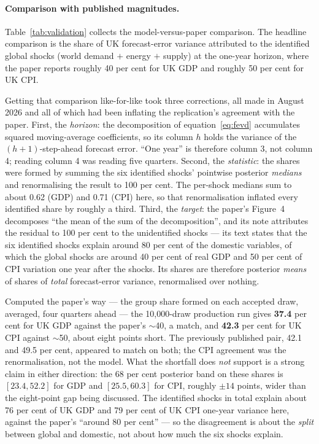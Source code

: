\paragraph{Comparison with published magnitudes.} Table~\ref{tab:validation} collects the model-versus-paper comparison. The headline comparison is the share of UK forecast-error variance attributed to the identified global shocks (world demand $+$ energy $+$ supply) at the one-year horizon, where the paper reports roughly 40 per cent for UK GDP and roughly 50 per cent for UK CPI.

Getting that comparison like-for-like took three corrections, all made in August 2026 and all of which had been inflating the replication's agreement with the paper. First, the \emph{horizon}: the decomposition of equation~\eqref{eq:fevd} accumulates squared moving-average coefficients, so its column $h$ holds the variance of the $(h{+}1)$-step-ahead forecast error. ``One year'' is therefore column 3, not column 4; reading column 4 was reading five quarters. Second, the \emph{statistic}: the shares were formed by summing the six identified shocks' pointwise posterior \emph{medians} and renormalising the result to 100 per cent. The per-shock medians sum to about 0.62 (GDP) and 0.71 (CPI) here, so that renormalisation inflated every identified share by roughly a third. Third, the \emph{target}: the paper's Figure~4 decomposes ``the mean of the sum of the decomposition'', and its note attributes the residual to 100 per cent to the unidentified shocks --- its text states that the six identified shocks explain around 80 per cent of the domestic variables, of which the global shocks are around 40 per cent of real GDP and 50 per cent of CPI variation one year after the shocks. Its shares are therefore posterior \emph{means} of shares of \emph{total} forecast-error variance, renormalised over nothing.

Computed the paper's way --- the group share formed on each accepted draw, averaged, four quarters ahead --- the 10{,}000-draw production run gives \textbf{37.4} per cent for UK GDP against the paper's $\sim$40, a match, and \textbf{42.3} per cent for UK CPI against $\sim$50, about eight points short. The previously published pair, 42.1 and 49.5 per cent, appeared to match on both; the CPI agreement was the renormalisation, not the model. What the shortfall does \emph{not} support is a strong claim in either direction: the 68 per cent posterior band on these shares is $[23.4, 52.2]$ for GDP and $[25.5, 60.3]$ for CPI, roughly $\pm14$ points, wider than the eight-point gap being discussed. The identified shocks in total explain about 76 per cent of UK GDP and 79 per cent of UK CPI one-year variance here, against the paper's ``around 80 per cent'' --- so the disagreement is about the \emph{split} between global and domestic, not about how much the six shocks explain.

